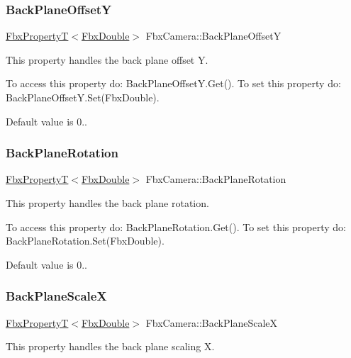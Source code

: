 \subsubsection{\texorpdfstring{Back\+Plane\+OffsetY}{BackPlaneOffsetY}}
{\footnotesize\ttfamily \hyperlink{class_fbx_property_t}{Fbx\+PropertyT}$<$\hyperlink{fbxtypes_8h_a171e72a1c46fc15c1a6c9c31948c1c5b}{Fbx\+Double}$>$ Fbx\+Camera\+::\+Back\+Plane\+OffsetY}

This property handles the back plane offset Y.

To access this property do\+: Back\+Plane\+Offset\+Y.\+Get(). To set this property do\+: Back\+Plane\+Offset\+Y.\+Set(\+Fbx\+Double).

Default value is 0.. \mbox{\label{class_fbx_camera_a25d0defefe7a7c69ee9fddfc8ea51036}} 
\subsubsection{\texorpdfstring{Back\+Plane\+Rotation}{BackPlaneRotation}}
{\footnotesize\ttfamily \hyperlink{class_fbx_property_t}{Fbx\+PropertyT}$<$\hyperlink{fbxtypes_8h_a171e72a1c46fc15c1a6c9c31948c1c5b}{Fbx\+Double}$>$ Fbx\+Camera\+::\+Back\+Plane\+Rotation}

This property handles the back plane rotation.

To access this property do\+: Back\+Plane\+Rotation.\+Get(). To set this property do\+: Back\+Plane\+Rotation.\+Set(\+Fbx\+Double).

Default value is 0.. \mbox{\label{class_fbx_camera_a34ab778778521406789a1798451791db}} 
\subsubsection{\texorpdfstring{Back\+Plane\+ScaleX}{BackPlaneScaleX}}
{\footnotesize\ttfamily \hyperlink{class_fbx_property_t}{Fbx\+PropertyT}$<$\hyperlink{fbxtypes_8h_a171e72a1c46fc15c1a6c9c31948c1c5b}{Fbx\+Double}$>$ Fbx\+Camera\+::\+Back\+Plane\+ScaleX}

This property handles the back plane scaling X.


